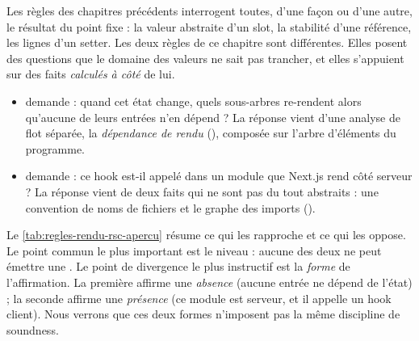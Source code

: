 Les règles des chapitres précédents interrogent toutes, d'une façon ou d'une autre, le résultat du
point fixe : la valeur abstraite d'un slot, la stabilité d'une référence, les lignes
 d'un setter. Les deux règles de ce chapitre sont différentes. Elles posent des
questions que le domaine des valeurs ne sait pas trancher, et elles s'appuient sur des faits
\emph{calculés à côté} de lui.

\begin{itemize}
  \item {} demande : \og quand cet état change, quels sous-arbres
        re-rendent alors qu'aucune de leurs entrées n'en dépend ?\fg{} La réponse vient d'une
        analyse de flot séparée, la \emph{dépendance de rendu} (), composée sur l'arbre
        d'éléments du programme.
  \item {} demande : \og ce hook est-il appelé dans un module que
        Next.js rend côté serveur ?\fg{} La réponse vient de deux faits qui ne sont pas du tout
        abstraits : une convention de noms de fichiers et le graphe des imports ().
\end{itemize}

Le \cref{tab:regles-rendu-rsc-apercu} résume ce qui les rapproche et ce qui les oppose. Le point
commun le plus important est le niveau : aucune des deux ne peut émettre une \Error{}. Le point
de divergence le plus instructif est la \emph{forme} de l'affirmation. La première affirme une
\emph{absence} (\og aucune entrée ne dépend de l'état\fg{}) ; la seconde affirme une
\emph{présence} (\og ce module est serveur, et il appelle un hook client\fg{}). Nous verrons que
ces deux formes n'imposent pas la même discipline de soundness.

